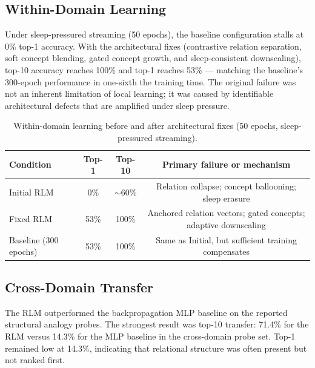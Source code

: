 \documentclass[11pt]{article}
\begin{document}
\subsection{Within-Domain Learning}
Under sleep-pressured streaming (50 epochs), the baseline configuration stalls at 0\% top-1 accuracy. With the architectural fixes (contrastive relation separation, soft concept blending, gated concept growth, and sleep-consistent downscaling), top-10 accuracy reaches 100\% and top-1 reaches 53\% --- matching the baseline's 300-epoch performance in one-sixth the training time. The original failure was not an inherent limitation of local learning; it was caused by identifiable architectural defects that are amplified under sleep pressure.

\begin{table}[h]
\centering
\caption{Within-domain learning before and after architectural fixes (50 epochs, sleep-pressured streaming).}
\begin{tabular}{lccc}
\toprule
Condition & Top-1 & Top-10 & Primary failure or mechanism \\
\midrule
Initial RLM & 0\% & $\sim$60\% & Relation collapse; concept ballooning; sleep erasure \\
Fixed RLM & 53\% & 100\% & Anchored relation vectors; gated concepts; adaptive downscaling \\
Baseline (300 epochs) & 53\% & 100\% & Same as Initial, but sufficient training compensates \\
\bottomrule
\end{tabular}
\end{table}

\subsection{Cross-Domain Transfer}
The RLM outperformed the backpropagation MLP baseline on the reported structural analogy probes. The strongest result was top-10 transfer: 71.4\% for the RLM versus 14.3\% for the MLP baseline in the cross-domain probe set. Top-1 remained low at 14.3\%, indicating that relational structure was often present but not ranked first.
\end{document}
